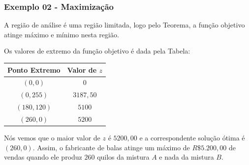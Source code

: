 \documentclass[hyperref={pdfpagelabels=false}]{beamer}
\begin{document}
\begin{frame}
\frametitle{Exemplo 02 - Maximização}

A região de análise é uma região limitada, logo pelo Teorema, a função objetivo atinge máximo e mínimo nesta região.

Os valores de extremo da função objetivo é dada pela Tabela:
\begin{table}[h]
	\centering
	\begin{tabular}{cc}
	\hline
	Ponto Extremo		&	Valor de $z$ 	\\
	\hline
	$(0,0)$		&	$0$	\\
	$(0,255)$	&	$3187,50$	\\
	$(180,120)$	&	$5100$	\\
	$(260,0)$	&	$5200$	\\
	\hline
	\end{tabular}
\end{table}

\pause

Nós vemos que o maior valor de $z$ é $5200,00$ e a correspondente solução ótima é $(260,0)$. Assim, o fabricante de balas atinge um máximo de $R\$5.200,00$ de vendas quando ele produz $260$ quilos da mistura $A$ e nada da mistura $B$.

\end{frame}
\end{document}
